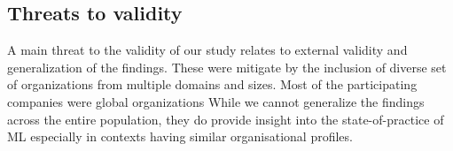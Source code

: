 
\subsection{Threats to validity}
A main threat to the validity of our study relates to external validity and generalization of the findings. These were mitigate by the inclusion of diverse set of organizations from multiple domains and sizes. Most of the participating companies were global organizations %
While we cannot generalize the findings across the entire population, they do provide insight into the state-of-practice of ML especially in contexts having similar organisational profiles. 









